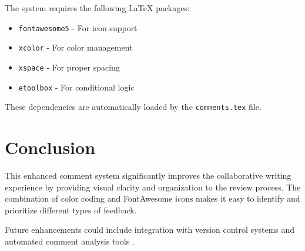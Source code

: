 \documentclass[magazine]{IEEEtran}
\begin{document}

The system requires the following LaTeX packages:
\begin{itemize}
\item \texttt{fontawesome5} - For icon support
\item \texttt{xcolor} - For color management  
\item \texttt{xspace} - For proper spacing
\item \texttt{etoolbox} - For conditional logic
\end{itemize}

These dependencies are automatically loaded by the \texttt{comments.tex} file.

\section{Conclusion}

This enhanced comment system significantly improves the collaborative writing experience by providing visual clarity and organization to the review process. The combination of color coding and FontAwesome icons makes it easy to identify and prioritize different types of feedback.


Future enhancements could include integration with version control systems and automated comment analysis tools \cite{Lamport:LaTeX}.


\vspace{0.5cm}
\noindent\commentcount



\end{document}
